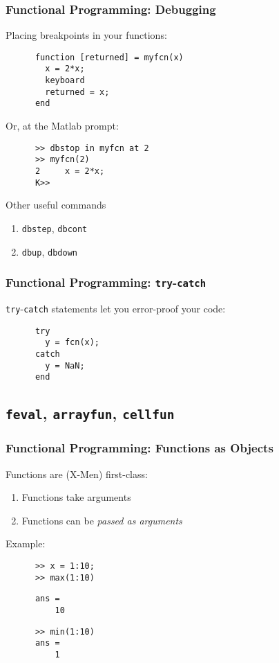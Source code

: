 \documentclass{beamer}
\begin{document}
  \begin{frame}[fragile]
    \frametitle{Functional Programming: Debugging}

    Placing breakpoints in your functions:
    \begin{lstlisting}
      function [returned] = myfcn(x)
        x = 2*x;
        keyboard
        returned = x;
      end
    \end{lstlisting}\pause
    Or, at the Matlab prompt:
    \begin{lstlisting}
      >> dbstop in myfcn at 2
      >> myfcn(2)
      2     x = 2*x;
      K>>
    \end{lstlisting}\pause
    Other useful commands
    \begin{enumerate}
      \item \texttt{dbstep}, \texttt{dbcont}\pause
      \item \texttt{dbup}, \texttt{dbdown}
    \end{enumerate}
	\end{frame}


  \begin{frame}[fragile]
    \frametitle{Functional Programming: \texttt{try}-\texttt{catch}}

    \texttt{try}-\texttt{catch} statements let you error-proof your
    code:
    \begin{lstlisting}
      try
        y = fcn(x);
      catch
        y = NaN;
      end
    \end{lstlisting}
	\end{frame}


\subsection{\texttt{feval}, \texttt{arrayfun}, \texttt{cellfun}}

  \begin{frame}[fragile]
    \frametitle{Functional Programming: Functions as Objects}

    Functions are (X-Men) first-class:
    \begin{enumerate}
      \item Functions take arguments\pause
      \item Functions can be \emph{passed as arguments}
    \end{enumerate}
    Example:
    \begin{lstlisting}
      >> x = 1:10;
      >> max(1:10)
      \end{lstlisting}\pause
      \vspace{-12pt}
      \begin{lstlisting}
      ans =
          10
      \end{lstlisting}\pause
      \vspace{-12pt}
      \begin{lstlisting}
      >> min(1:10)
      ans =
          1
    \end{lstlisting}
	\end{frame}
\end{document}
